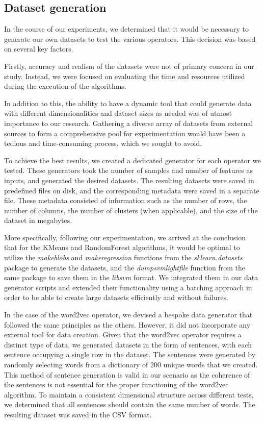 \documentclass[conference]{IEEEtran}
\begin{document}
\subsection{Dataset generation}
In the course of our experiments, we determined that it would be necessary to generate our own datasets to test the various operators. This decision was based on several key factors.
\par
Firstly, accuracy and realism of the datasets were not of primary concern in our study. Instead, we were focused on evaluating the time and resources utilized during the execution of the algorithms.
\par
In addition to this, the ability to have a dynamic tool that could generate data with different dimensionalities and dataset sizes as needed was of utmost importance to our research. Gathering a diverse array of datasets from external sources to form a comprehensive pool for experimentation would have been a tedious and time-consuming process, which we sought to avoid.
\par
To achieve the best results, we created a dedicated generator for each operator we tested. These generators took the number of samples and number of features as inputs, and generated the desired datasets. The resulting datasets were saved in predefined files on disk, and the corresponding metadata were saved in a separate file. These metadata consisted of information such as the number of rows, the number of columns, the number of clusters (when applicable), and the size of the dataset in megabytes.
\par
More specifically, following our experimentation, we arrived at the conclusion that for the KMeans and RandomForest algorithms, it would be optimal to utilize the \textit{make\textunderscore blobs} and \textit{make\textunderscore regression} functions from the \textit{sklearn.datasets} package to generate the datasets, and the \textit{dump\textunderscore svmlight\textunderscore file} function from the same package to save them in the \textit{libsvm} format. We integrated them in our data generator scripts and extended their functionality using a batching approach in order to be able to create large datasets efficiently and without failures.
\par
In the case of the word2vec operator, we devised a bespoke data generator that followed the same principles as the others. However, it did not incorporate any external tool for data creation. Given that the word2vec operator requires a distinct type of data, we generated datasets in the form of sentences, with each sentence occupying a single row in the dataset. The sentences were generated by randomly selecting words from a dictionary of 200 unique words that we created. This method of sentence generation is valid in our scenario as the coherence of the sentences is not essential for the proper functioning of the word2vec algorithm. To maintain a consistent dimensional structure across different tests, we determined that all sentences should contain the same number of words. The resulting dataset was saved in the CSV format.
\end{document}
